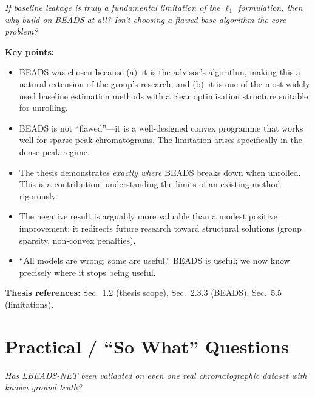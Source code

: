 \documentclass[11pt, letterpaper]{article}
\newcounter{qcounter}
\newcommand{\question}[1]{%
  \stepcounter{qcounter}%
  \begin{questionbox}[Q\theqcounter]%
    \itshape #1%
  \end{questionbox}%
}
\begin{document}
\question{If baseline leakage is truly a fundamental limitation of the
$\ell_1$ formulation, then why build on BEADS at all?  Isn't
choosing a flawed base algorithm the core problem?}

\begin{answerbox}
\textbf{Key points:}
\begin{itemize}[nosep]
  \item BEADS was chosen because (a)~it is the advisor's algorithm,
        making this a natural extension of the group's research, and
        (b)~it is one of the most widely used baseline estimation
        methods with a clear optimisation structure suitable for
        unrolling.
  \item BEADS is not ``flawed''---it is a well-designed convex
        programme that works well for sparse-peak chromatograms.
        The limitation arises specifically in the dense-peak regime.
  \item The thesis demonstrates \emph{exactly where} BEADS breaks
        down when unrolled.  This is a contribution: understanding
        the limits of an existing method rigorously.
  \item The negative result is arguably more valuable than a modest
        positive improvement: it redirects future research toward
        structural solutions (group sparsity, non-convex penalties).
  \item ``All models are wrong; some are useful.''  BEADS is useful;
        we now know precisely where it stops being useful.
\end{itemize}
\textbf{Thesis references:} Sec.~1.2 (thesis scope), Sec.~2.3.3 (BEADS), Sec.~5.5 (limitations).
\end{answerbox}


\section{Practical / ``So What'' Questions}

\question{Has LBEADS-NET been validated on even \emph{one} real
chromatographic dataset with known ground truth?}
\end{document}
